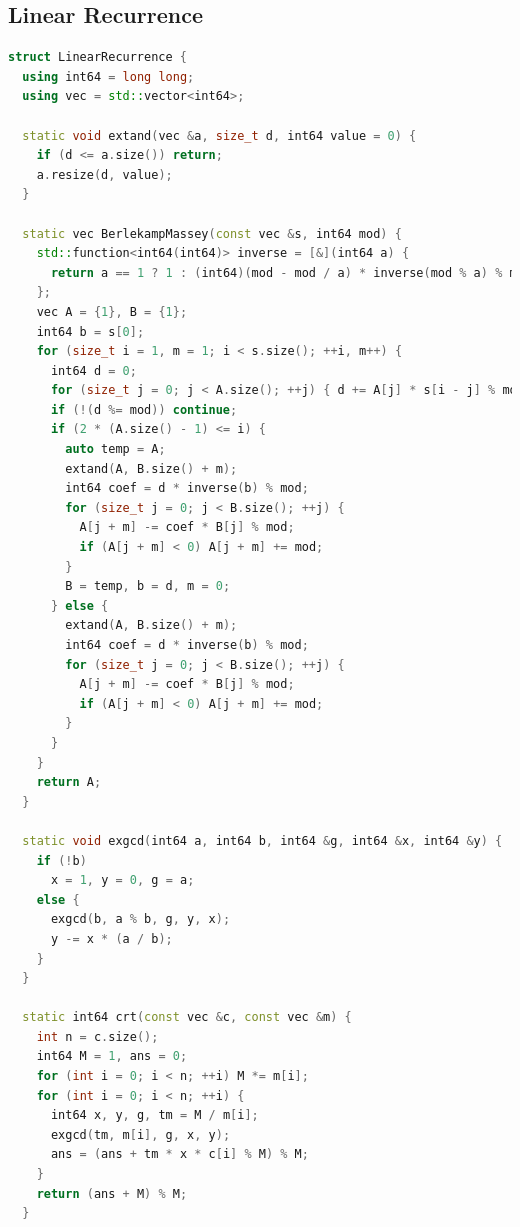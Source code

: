 \documentclass[twoside]{article}
\begin{document}
\subsection{Linear Recurrence}
\begin{lstlisting}[language=c++]
struct LinearRecurrence {
  using int64 = long long;
  using vec = std::vector<int64>;

  static void extand(vec &a, size_t d, int64 value = 0) {
    if (d <= a.size()) return;
    a.resize(d, value);
  }

  static vec BerlekampMassey(const vec &s, int64 mod) {
    std::function<int64(int64)> inverse = [&](int64 a) {
      return a == 1 ? 1 : (int64)(mod - mod / a) * inverse(mod % a) % mod;
    };
    vec A = {1}, B = {1};
    int64 b = s[0];
    for (size_t i = 1, m = 1; i < s.size(); ++i, m++) {
      int64 d = 0;
      for (size_t j = 0; j < A.size(); ++j) { d += A[j] * s[i - j] % mod; }
      if (!(d %= mod)) continue;
      if (2 * (A.size() - 1) <= i) {
        auto temp = A;
        extand(A, B.size() + m);
        int64 coef = d * inverse(b) % mod;
        for (size_t j = 0; j < B.size(); ++j) {
          A[j + m] -= coef * B[j] % mod;
          if (A[j + m] < 0) A[j + m] += mod;
        }
        B = temp, b = d, m = 0;
      } else {
        extand(A, B.size() + m);
        int64 coef = d * inverse(b) % mod;
        for (size_t j = 0; j < B.size(); ++j) {
          A[j + m] -= coef * B[j] % mod;
          if (A[j + m] < 0) A[j + m] += mod;
        }
      }
    }
    return A;
  }

  static void exgcd(int64 a, int64 b, int64 &g, int64 &x, int64 &y) {
    if (!b)
      x = 1, y = 0, g = a;
    else {
      exgcd(b, a % b, g, y, x);
      y -= x * (a / b);
    }
  }

  static int64 crt(const vec &c, const vec &m) {
    int n = c.size();
    int64 M = 1, ans = 0;
    for (int i = 0; i < n; ++i) M *= m[i];
    for (int i = 0; i < n; ++i) {
      int64 x, y, g, tm = M / m[i];
      exgcd(tm, m[i], g, x, y);
      ans = (ans + tm * x * c[i] % M) % M;
    }
    return (ans + M) % M;
  }


\end{lstlisting}
\end{document}
